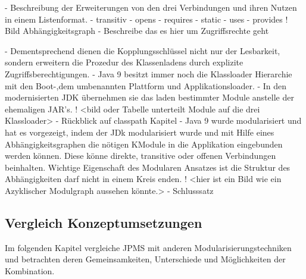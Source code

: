   - Beschreibung der Erweiterungen von den drei Verbindungen und ihren Nutzen in einem Listenformat.
  - transitiv
  - opens
  - requires
  - static
  - uses
  - provides
! Bild Abhängigkeitsgraph
-  Beschreibe das es hier um Zugriffsrechte geht 

- Dementsprechend dienen die Kopplungsschlüssel nicht nur der Lesbarkeit, sondern erweitern die Prozedur des Klassenladens durch explizite Zugriffsberechtigungen. 
- Java 9 besitzt immer noch die Klassloader Hierarchie mit den Boot-,dem umbenannten Plattform und Applikationsloader.
- In den modernisierten JDK  übernehmen sie das laden bestimmter Module anstelle der ehemaligen JAR's.
!  <bild oder Tabelle unterteilt Module auf die drei  Klassloader> 
- Rückblick auf classpath Kapitel 
- Java 9 wurde modularisiert und hat es vorgezeigt, indem der JDk modularisiert wurde und mit Hilfe eines Abhängigkeitsgraphen  die nötigen KModule in die Applikation eingebunden werden können. Diese könne direkte, transitive oder offenen Verbindungen beinhalten. Wichtige Eigenschaft des Modularen Ansatzes ist die Struktur des Abhängigkeiten darf nicht in einem Kreis enden.
! <hier ist ein Bild wie ein Azyklischer Modulgraph aussehen könnte.> 
- Schlusssatz 

\newpage \subsection{Vergleich Konzeptumsetzungen}
  Im folgenden Kapitel vergleiche JPMS mit anderen Modularisierungstechniken und betrachten deren Gemeinsamkeiten, Unterschiede und Möglichkeiten der Kombination. 


